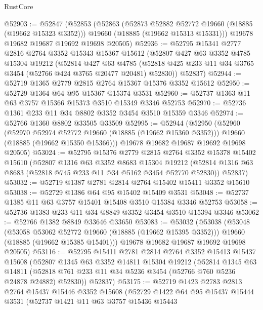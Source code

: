\begin{lexlean}{RustCore}
\begin{coremodule}
@52903 := @52847
    (@52853
      (@52863
        (@52873 @52882 @52772 @19660 (@18885 (@19662 @15323 @3352)))
        @19660
        (@18885 (@19662 @15313 @15331)))
      @19678
      @19682
      @19687
      @19692
      @19698
      @20505)
@52936 := @52795
    @15341
    @2777
    @2816
    @2764
    @3352
    @15343
    @15367
    @15612
    (@52807
      @427
      @63
      @3352
      @4785
      @15304
      @19212
      (@52814
        @427
        @63
        @4785
        (@52818 @425 @233 @11 @34 @3765 @3454 (@52766 @424 @3765 @20477 @20481) @52830))
      @52837)
@52944 := @52719 @1365 @2779 @2815 @2764 @15367 @15376 @3352 @15612
@52950 := @52729 @1364 @64 @95 @15367 @15374 @3531
@52960 := @52737 @1363 @11 @63 @3757 @15366 @15373 @3510 @15349 @3346 @52753
@52970 := @52736 @1361 @233 @11 @34 @8802 @3352 @3454 @3510 @15359 @3346
@52974 := @52766 @1360 @8802 @33505 @33509
@52995 := @52944
    (@52950
      (@52960
        (@52970 @52974 @52772 @19660 (@18885 (@19662 @15360 @3352)))
        @19660
        (@18885 (@19662 @15350 @15366)))
      @19678
      @19682
      @19687
      @19692
      @19698
      @20505)
@53024 := @52795
    @15376
    @2779
    @2815
    @2764
    @3352
    @15378
    @15402
    @15610
    (@52807
      @1316
      @63
      @3352
      @8683
      @15304
      @19212
      (@52814 @1316 @63 @8683 (@52818 @745 @233 @11 @34 @5162 @3454 @52770 @52830))
      @52837)
@53032 := @52719 @1387 @2781 @2814 @2764 @15402 @15411 @3352 @15610
@53038 := @52729 @1386 @64 @95 @15402 @15409 @3531
@53048 := @52737 @1385 @11 @63 @3757 @15401 @15408 @3510 @15384 @3346 @52753
@53058 := @52736 @1383 @233 @11 @34 @8849 @3352 @3454 @3510 @15394 @3346
@53062 := @52766 @1382 @8849 @33646 @33650
@53083 := @53032
    (@53038
      (@53048
        (@53058 @53062 @52772 @19660 (@18885 (@19662 @15395 @3352)))
        @19660
        (@18885 (@19662 @15385 @15401)))
      @19678
      @19682
      @19687
      @19692
      @19698
      @20505)
@53116 := @52795
    @15411
    @2781
    @2814
    @2764
    @3352
    @15413
    @15437
    @15608
    (@52807
      @1345
      @63
      @3352
      @14811
      @15304
      @19212
      (@52814
        @1345
        @63
        @14811
        (@52818 @761 @233 @11 @34 @5236 @3454 (@52766 @760 @5236 @24878 @24882) @52830))
      @52837)
@53175 := @52719
    @1423
    @2783
    @2813
    @2764
    @15437
    @15446
    @3352
    @15608
    (@52729
      @1422
      @64
      @95
      @15437
      @15444
      @3531
      (@52737
        @1421
        @11
        @63
        @3757
        @15436
        @15443

\end{coremodule}
\end{lexlean}

